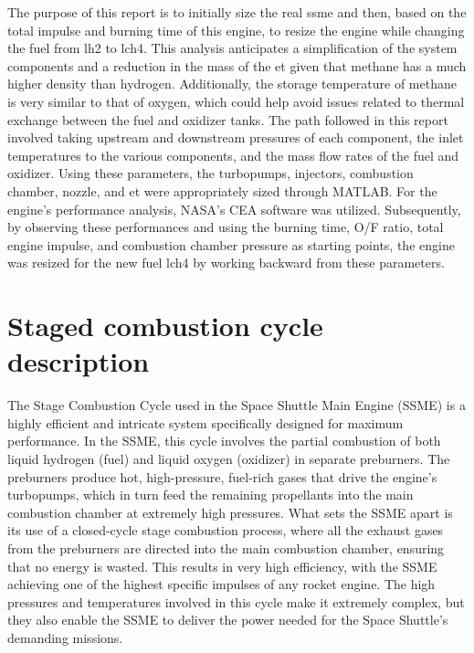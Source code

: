 
The purpose of this report is to initially size the real \acrfull{ssme} and then, based on the total impulse and burning time of this engine, to resize the engine while changing the fuel from \acrlong{lh2} to \acrfull{lch4}. 
This analysis anticipates a simplification of the system components and a reduction in the mass of the \acrfull{et} given that methane has a much higher density than hydrogen. Additionally, the storage temperature of methane is very similar to that of oxygen, which could help avoid issues related to thermal exchange between the fuel and oxidizer tanks.
The path followed in this report involved taking upstream and downstream pressures of each component, the inlet temperatures to the various components, and the mass flow rates of the fuel and oxidizer. Using these parameters, the turbopumps, injectors, combustion chamber, nozzle, and \acrlong{et} were appropriately sized through MATLAB. For the engine's performance analysis, NASA's CEA software was utilized. Subsequently, by observing these performances and using the burning time, O/F ratio, total engine impulse, and combustion chamber pressure as starting points, the engine was resized for the new fuel \acrshort{lch4} by working backward from these parameters.
\section{Staged combustion cycle description}
The Stage Combustion Cycle used in the Space Shuttle Main Engine (SSME) is a highly efficient and intricate system specifically designed for maximum performance.
In the SSME, this cycle involves the partial combustion of both liquid hydrogen (fuel) and liquid oxygen (oxidizer) in separate preburners. 
The preburners produce hot, high-pressure, fuel-rich gases that drive the engine's turbopumps, which in turn feed the remaining propellants into the main combustion chamber at extremely high pressures.
What sets the SSME apart is its use of a closed-cycle stage combustion process, where all the exhaust gases from the preburners are directed into the main combustion chamber, ensuring that no energy is wasted.
This results in very high efficiency, with the SSME achieving one of the highest specific impulses of any rocket engine.
The high pressures and temperatures involved in this cycle make it extremely complex, but they also enable the SSME to deliver the power needed for the Space Shuttle's demanding missions.

